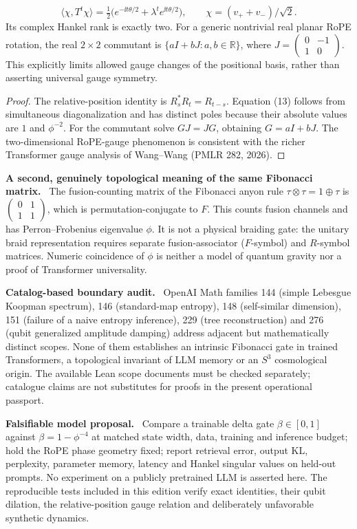 \documentclass[11pt,a4paper,oneside]{book}
\newcommand{\R}{\mathbb R}\newcommand{\C}{\mathbb C}\newcommand{\Z}{\mathbb Z}\newcommand{\N}{\mathbb N}\newcommand{\Q}{\mathbb Q}
\newcommand{\note}[1]{\par\medskip\noindent\textbf{#1}\ }
\begin{document}
\begin{equation}\langle\chi,T^t\chi\rangle=\tfrac12\bigl(e^{-\ii t\theta/2}+\lambda^te^{\ii t\theta/2}\bigr),\qquad\chi=(v_++v_-)/\sqrt2.\tag{13}\end{equation}
Its complex Hankel rank is exactly two. For a generic nontrivial real planar RoPE rotation, the real $2\times2$ commutant is $\{aI+bJ:a,b\in\R\}$, where $J=\left(\begin{smallmatrix}0&-1\\1&0\end{smallmatrix}\right)$. This explicitly limits allowed gauge changes of the positional basis, rather than asserting universal gauge symmetry.
\begin{proof}The relative-position identity is $R_s^*R_t=R_{t-s}$. Equation (13) follows from simultaneous diagonalization and has distinct poles because their absolute values are $1$ and $\phi^{-2}$. For the commutant solve $GJ=JG$, obtaining $G=aI+bJ$. The two-dimensional RoPE-gauge phenomenon is consistent with the richer Transformer gauge analysis of Wang--Wang (PMLR 282, 2026).\end{proof}
\note{A second, genuinely topological meaning of the same Fibonacci matrix.} The fusion-counting matrix of the Fibonacci anyon rule $\tau\otimes\tau=1\oplus\tau$ is $\left(\begin{smallmatrix}0&1\\1&1\end{smallmatrix}\right)$, which is permutation-conjugate to $F$. This counts fusion channels and has Perron--Frobenius eigenvalue $\phi$. It is not a physical braiding gate: the unitary braid representation requires separate fusion-associator ($F$-symbol) and $R$-symbol matrices. Numeric coincidence of $\phi$ is neither a model of quantum gravity nor a proof of Transformer universality.
\note{Catalog-based boundary audit.} OpenAI Math families 144 (simple Lebesgue Koopman spectrum), 146 (standard-map entropy), 148 (self-similar dimension), 151 (failure of a naive entropy inference), 229 (tree reconstruction) and 276 (qubit generalized amplitude damping) address adjacent but mathematically distinct scopes. None of them establishes an intrinsic Fibonacci gate in trained Transformers, a topological invariant of LLM memory or an $S^3$ cosmological origin. The available Lean scope documents must be checked separately; catalogue claims are not substitutes for proofs in the present operational passport.
\note{Falsifiable model proposal.} Compare a trainable delta gate $\beta\in[0,1]$ against $\beta=1-\phi^{-4}$ at matched state width, data, training and inference budget; hold the RoPE phase geometry fixed; report retrieval error, output KL, perplexity, parameter memory, latency and Hankel singular values on held-out prompts. No experiment on a publicly pretrained LLM is asserted here. The reproducible tests included in this edition verify exact identities, their qubit dilation, the relative-position gauge relation and deliberately unfavorable synthetic dynamics.
\end{document}
